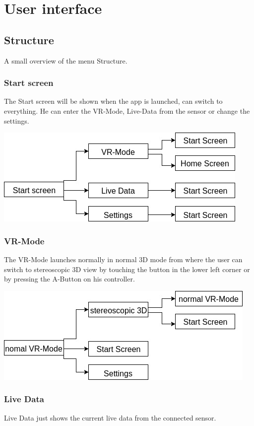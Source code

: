 \section{User interface}

\subsection{Structure}

A small overview of the menu Structure.

\subsubsection{Start screen}
The Start screen will be shown when the app is launched, can switch to everything. He can enter the VR-Mode, Live-Data from the sensor or change the settings.

\includegraphics[scale=0.5]{pics/startscreen.jpg}

\subsubsection{VR-Mode}

The VR-Mode launches normally in normal 3D mode from where the user can switch to stereoscopic 3D view by touching the button in the lower left corner or by pressing the A-Button on his controller.

\includegraphics[scale=0.5]{pics/Vr-Mode.jpg}


\subsubsection{Live Data}
Live Data just shows the current live data from the connected sensor.

